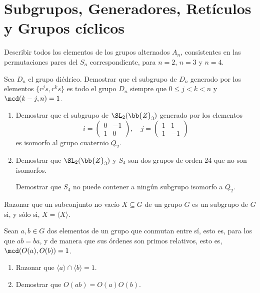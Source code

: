 \section{Subgrupos, Generadores, Retículos y Grupos cíclicos}

\begin{ejercicio}\label{ej:3.1}
    Describir todos los elementos de los grupos alternados $A_n$, consistentes en las permutaciones pares del $S_n$ correspondiente, para $n = 2$, $n = 3$ y $n = 4$.    
\end{ejercicio}

\begin{ejercicio}\label{ej:3.2}
    Sea $D_n$ el grupo diédrico. Demostrar que el subgrupo de $D_n$ generado por los elementos $\{r^js, r^ks\}$ es todo el grupo $D_n$ siempre que $0 \leq j < k < n$ y $\mcd(k - j, n) = 1$.
\end{ejercicio}

\begin{ejercicio}\label{ej:3.3}
    \begin{enumerate}
        \item Demostrar que el subgrupo de $\SL_2(\bb{Z}_3)$ generado por los elementos
        \[
            i = \begin{pmatrix}
                0 & -1 \\
                1 & 0
            \end{pmatrix}, \quad j = \begin{pmatrix}
                1 & 1 \\
                1 & -1
            \end{pmatrix}
        \]
        es isomorfo al grupo cuaternio $Q_2$.
        \item Demostrar que $\SL_2(\bb{Z}_3)$ y $S_4$ son dos grupos de orden 24 que no son isomorfos.
        \begin{observacion}
            Demostrar que $S_4$ no puede contener a ningún subgrupo isomorfo a $Q_2$.
        \end{observacion}
    \end{enumerate}
\end{ejercicio}

\begin{ejercicio}\label{ej:3.4}
    Razonar que un subconjunto no vacío $X \subseteq G$ de un grupo $G$ es un subgrupo de $G$ si, y sólo si, $X = \langle X \rangle$.
\end{ejercicio}

\begin{ejercicio}\label{ej:3.5}
    Sean $a, b \in G$ dos elementos de un grupo que conmutan entre sí, esto es, para los que $ab = ba$, y de manera que sus órdenes son primos relativos, esto es, $\mcd(O(a), O(b)) = 1$.
    \begin{enumerate}
        \item Razonar que $\langle a \rangle \cap \langle b \rangle = 1$.
        \item Demostrar que $O(ab) = O(a)O(b)$.
    \end{enumerate}
\end{ejercicio}

